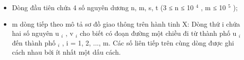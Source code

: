 \begin{itemize}
	\item Dòng đầu tiên chứa 4 số nguyên dương n, m, s, t (3 ≤ n ≤ 10 $^ 4 $ , m ≤ 10 $^ 5 $ );
	\item m dòng tiếp theo mô tả sơ đồ giao thông trên hành tinh X: Dòng thứ i chứa hai số nguyên u $_ i $ , v $_ i $ cho biết có đoạn đường một chiều đi từ thành phố u $_ i $ đến thành phố $_ i $ , i = 1, 2, ..., m. Các số liên tiếp trên cùng dòng được ghi cách nhau bởi ít nhất một dấu cách.
\end{itemize}

\
